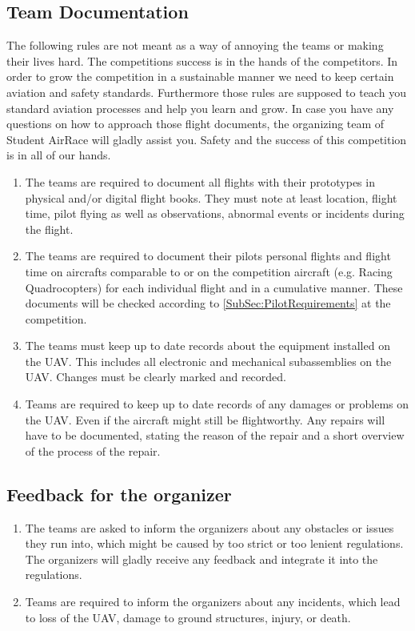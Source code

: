     \subsection{Team Documentation}
    The following rules are not meant as a way of annoying the teams or making their lives hard. The competitions success is in the hands of the competitors. In order to grow the competition 
    in a sustainable manner we need to keep certain aviation and safety standards. Furthermore those rules are supposed to teach you standard aviation processes and help you learn and grow. 
    In case you have any questions on how to approach those flight documents, the organizing team of Student AirRace will gladly assist you. Safety and the success of this competition is in all of our hands.
    \begin{enumerate}
      \item The teams are required to document all flights with their prototypes in physical and/or digital flight books. They must note at least location, flight time, pilot flying 
      as well as observations, abnormal events or incidents during the flight.
      \item The teams are required to document their pilots personal flights and flight time on aircrafts comparable to or on the competition aircraft (e.g. Racing Quadrocopters)
      for each individual flight and in a cumulative manner. These documents will be checked according to \ref{SubSec:PilotRequirements} at the competition. 
      \item The teams must keep up to date records about the equipment installed on the UAV. This includes all electronic and mechanical subassemblies on the UAV. 
      Changes must be clearly marked and recorded. 
      \item Teams are required to keep up to date records of any damages or problems on the UAV. Even if the aircraft might still be flightworthy. 
      Any repairs will have to be documented, stating the reason of the repair and a short overview of the process of the repair. 
    \end{enumerate}

    \subsection{Feedback for the organizer}
    \begin{enumerate}
      \item The teams are asked to inform the organizers about any obstacles or issues they run into, which might be caused by
      too strict or too lenient regulations. The organizers will gladly receive any feedback and integrate it into the regulations. 
      \item Teams are required to inform the organizers about any incidents, which lead to loss of the UAV, damage to ground structures, injury, or death. 
    \end{enumerate}



